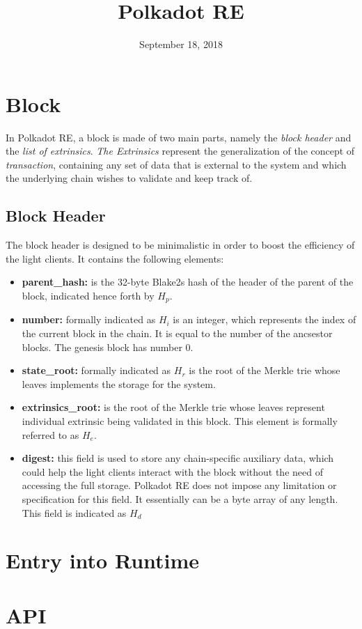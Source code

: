 \documentclass{article}
\newcommand{\tmem}[1]{{\em #1\/}}
\newcommand{\tmsamp}[1]{\textsf{#1}}
\newcommand{\tmstrong}[1]{\textbf{#1}}
\newcommand{\tmtextbf}[1]{{\bfseries{#1}}}
\newcommand{\tmtextit}[1]{{\itshape{#1}}}
\begin{document}
\title{Polkadot RE}

\date{September 18, 2018}

\maketitle

\section{Block}

In Polkadot RE, a block is made of two main parts, namely the \tmtextit{block
header} and the \tmtextit{list of extrinsics}. {\tmem{The Extrinsics}}
represent the generalization of the concept of {\tmem{transaction}},
containing any set of data that is external to the system and which the
underlying chain wishes to validate and keep track of.

\subsection{Block Header}

The block header is designed to be minimalistic in order to boost the
efficiency of the light clients. It contains the following elements:

\begin{itemize}

\item \tmtextbf{{\tmsamp{parent\_hash:}}} is the 32-byte Blake2s hash of the header
of the parent of the block, indicated hence forth by {\tmtextbf{$H_p$}}.

\item {\tmstrong{{\tmsamp{number:}}}} formally indicated as {\tmstrong{$H_i$}} is an
integer, which represents the index of the current block in the chain. It is
equal to the number of the ancsestor blocks. The genesis block has number 0.

\item {\tmstrong{{\tmsamp{state\_root:}}}} formally indicated as {\tmstrong{$H_r$}}
is the root of the Merkle trie whose leaves implements the storage for the
system.

\item {\tmstrong{{\tmsamp{extrinsics\_root:}}}} is the root of the Merkle trie whose
leaves represent individual extrinsic being validated in this block. This
element is formally referred to as {\tmstrong{$H_e$}}.

\item {\tmstrong{{\tmsamp{digest:}}}} this field is used to store any chain-specific
auxiliary data, which could help the light clients interact with the block
without the need of accessing the full storage. Polkadot RE does not impose any limitation or specification for this field. It essentially can be a byte array of any length. This field is indicated as
{\tmstrong{$H_d$}}
\end{itemize}

\section{Entry into Runtime}

\section{API}

\
\end{document}
